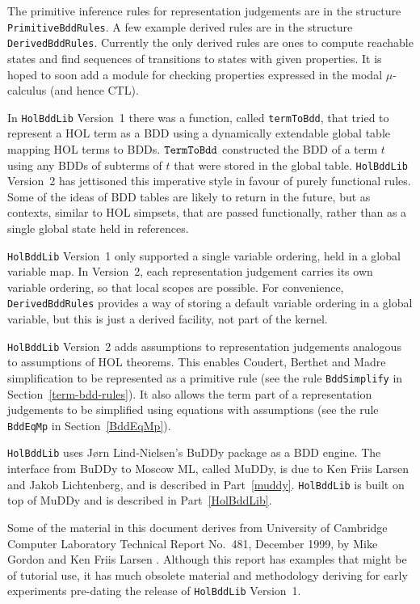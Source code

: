 \documentclass[12pt]{article}
\renewcommand{\t}[1]{\mbox{\tt #1}}
\newcommand\HOL{HOL\xspace}
\newcommand{\Buddy}{BuDDy\xspace}
\newcommand{\Muddy}{MuDDy\xspace}
\begin{document}
The primitive inference rules for representation judgements are in the structure
{\tt{PrimitiveBddRules}}. A few example derived rules are in the
structure {\tt{DerivedBddRules}}. Currently the only derived rules are
ones to compute reachable states and find sequences of transitions to
states with given properties.  It is hoped to soon add a module for
checking properties expressed in the modal $\mu$-calculus (and hence CTL).

In {\tt{HolBddLib}} Version~1 there was a function, called
{\texttt{termToBdd}}, that tried to represent a \HOL{} term as a BDD
using a dynamically extendable global table mapping \HOL{} terms to
BDDs.  $\t{TermToBdd}$ constructed the BDD of a term $t$ using any
BDDs of subterms of $t$ that were stored in the global table.
{\tt{HolBddLib}} Version~2 has jettisoned this imperative style
in favour of purely functional rules. Some of
the ideas of BDD tables are likely to return in the future, but as
contexts, similar to HOL simpsets, that are passed functionally,
rather than as a single global state held in references.

{\tt{HolBddLib}} Version~1 only supported a single variable
ordering, held in a global variable map. In Version~2, each
representation judgement carries its own variable ordering, so that local
scopes are possible. For convenience, {\tt{DerivedBddRules}}
provides a way of storing a default variable ordering in a global
variable, but this is just a derived facility, not part of the kernel.

{\tt{HolBddLib}} Version~2 adds assumptions to representation judgements
analogous to assumptions of HOL theorems. This enables
Coudert, Berthet and Madre simplification to be represented as a primitive
rule (see the rule \t{BddSimplify} in 
Section~\ref{term-bdd-rules}). 
It also allows the term part
of a representation judgements to be simplified using equations with assumptions
(see the rule \t{BddEqMp} in Section~\ref{BddEqMp}).

{\tt HolBddLib} uses J{\o}rn Lind-Nielsen's \Buddy{} package as a BDD
engine. The interface from \Buddy{} to Moscow ML, called \Muddy, is
due to Ken Friis Larsen and Jakob Lichtenberg, and is described in Part~\ref{muddy}.
{\tt HolBddLib} is built on top of \Muddy{} and
is described in Part~\ref{HolBddLib}.

Some of the material in this document derives from University of
Cambridge Computer Laboratory Technical Report No.~481, December 1999,
by Mike Gordon and Ken Friis Larsen \cite{GordonLarsen}. Although this
report has examples that might be of tutorial use, it has much
obsolete material and methodology deriving for early experiments
pre-dating the release of {\tt HolBddLib} Version~1.
\end{document}
